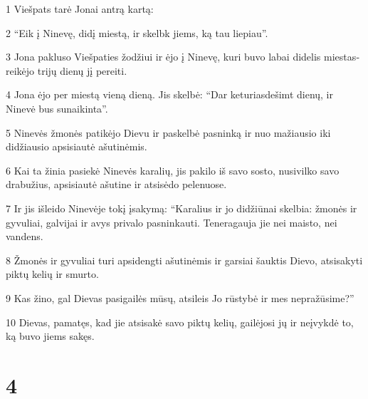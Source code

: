 \par 1 Viešpats tarė Jonai antrą kartą: 
\par 2 “Eik į Ninevę, didį miestą, ir skelbk jiems, ką tau liepiau”. 
\par 3 Jona pakluso Viešpaties žodžiui ir ėjo į Ninevę, kuri buvo labai didelis miestas­reikėjo trijų dienų jį pereiti. 
\par 4 Jona ėjo per miestą vieną dieną. Jis skelbė: “Dar keturiasdešimt dienų, ir Ninevė bus sunaikinta”. 
\par 5 Ninevės žmonės patikėjo Dievu ir paskelbė pasninką ir nuo mažiausio iki didžiausio apsisiautė ašutinėmis. 
\par 6 Kai ta žinia pasiekė Ninevės karalių, jis pakilo iš savo sosto, nusivilko savo drabužius, apsisiautė ašutine ir atsisėdo pelenuose. 
\par 7 Ir jis išleido Ninevėje tokį įsakymą: “Karalius ir jo didžiūnai skelbia: žmonės ir gyvuliai, galvijai ir avys privalo pasninkauti. Teneragauja jie nei maisto, nei vandens. 
\par 8 Žmonės ir gyvuliai turi apsidengti ašutinėmis ir garsiai šauktis Dievo, atsisakyti piktų kelių ir smurto. 
\par 9 Kas žino, gal Dievas pasigailės mūsų, atsileis Jo rūstybė ir mes nepražūsime?” 
\par 10 Dievas, pamatęs, kad jie atsisakė savo piktų kelių, gailėjosi jų ir neįvykdė to, ką buvo jiems sakęs.



\chapter{4}


